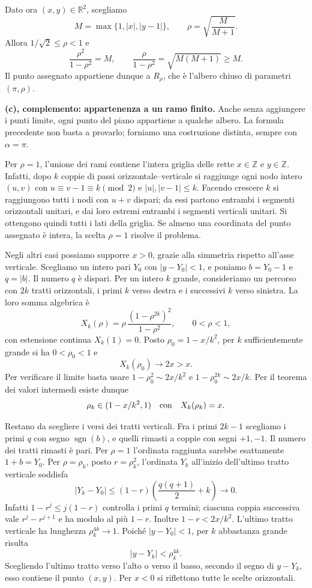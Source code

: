 {Dato ora $(x,y)\in\mathbb R^2$, scegliamo
\[
 M=\max\{1,|x|,|y-1|\},\qquad \rho=\sqrt{\frac{M}{M+1}}.
\]
Allora $1/\sqrt2\le\rho<1$ e
\[
 \frac{\rho^2}{1-\rho^2}=M,
 \qquad
 \frac{\rho}{1-\rho^2}=\sqrt{M(M+1)}\ge M.
\]
Il punto assegnato appartiene dunque a $R_\rho$, che \`e l'albero
chiuso di parametri $(\pi,\rho)$.

\textbf{(c), complemento: appartenenza a un ramo finito.}
Anche senza aggiungere i punti limite, ogni punto del piano appartiene
a qualche albero. La formula precedente non basta a provarlo;
forniamo una costruzione distinta, sempre con $\alpha=\pi$.

Per $\rho=1$, l'unione dei rami contiene l'intera griglia delle rette
$x\in\mathbb Z$ e $y\in\mathbb Z$. Infatti, dopo $k$ coppie di passi
orizzontale--verticale si raggiunge ogni nodo intero $(u,v)$ con
$u\equiv v-1\equiv k\pmod2$ e $|u|,|v-1|\le k$.
Facendo crescere $k$ si raggiungono tutti i nodi con $u+v$ dispari;
da essi partono entrambi i segmenti orizzontali unitari, e dai loro
estremi entrambi i segmenti verticali unitari. Si ottengono quindi
tutti i lati della griglia. Se almeno una coordinata del punto
assegnato \`e intera, la scelta $\rho=1$ risolve il problema.

Negli altri casi possiamo supporre $x>0$, grazie alla simmetria
rispetto all'asse verticale. Scegliamo un intero pari $Y_0$ con
$|y-Y_0|<1$, e poniamo $b=Y_0-1$ e $q=|b|$. Il numero $q$ \`e dispari.
Per un intero $k$ grande, consideriamo un percorso con $2k$ tratti
orizzontali, i primi $k$ verso destra e i successivi $k$ verso sinistra.
La loro somma algebrica \`e
\[
 X_k(\rho)=\rho\,\frac{(1-\rho^{2k})^2}{1-\rho^2},
 \qquad 0<\rho<1,
\]
con estensione continua $X_k(1)=0$. Posto $\rho_0=1-x/k^2$, per
$k$ sufficientemente grande si ha $0<\rho_0<1$ e
\[
 X_k(\rho_0)\longrightarrow 2x>x.
\]
Per verificare il limite basta usare
$1-\rho_0^2\sim2x/k^2$ e $1-\rho_0^{2k}\sim2x/k$.
Per il teorema dei valori intermedi esiste dunque
\[
 \rho_k\in(1-x/k^2,1)\quad\hbox{con}\quad X_k(\rho_k)=x.
\]

Restano da scegliere i versi dei tratti verticali. Fra i primi
$2k-1$ scegliamo i primi $q$ con segno $\operatorname{sgn}(b)$,
e quelli rimasti a coppie con segni $+1,-1$.
Il numero dei tratti rimasti \`e pari. Per $\rho=1$ l'ordinata
raggiunta sarebbe esattamente $1+b=Y_0$.
Per $\rho=\rho_k$, posto $r=\rho_k^2$, l'ordinata $Y_k$ all'inizio
dell'ultimo tratto verticale soddisfa
\[
 |Y_k-Y_0|\le(1-r)\left(\frac{q(q+1)}2+k\right)\longrightarrow0.
\]
Infatti $1-r^j\le j(1-r)$ controlla i primi $q$ termini;
ciascuna coppia successiva vale $r^j-r^{j+1}$ e ha modulo
al pi\`u $1-r$. Inoltre $1-r<2x/k^2$.
L'ultimo tratto verticale ha lunghezza $\rho_k^{4k}\to1$.
Poich\'e $|y-Y_0|<1$, per $k$ abbastanza grande risulta
\[
 |y-Y_k|<\rho_k^{4k}.
\]
Scegliendo l'ultimo tratto verso l'alto o verso il basso, secondo
il segno di $y-Y_k$, esso contiene il punto $(x,y)$.
Per $x<0$ si riflettono tutte le scelte orizzontali.

}
